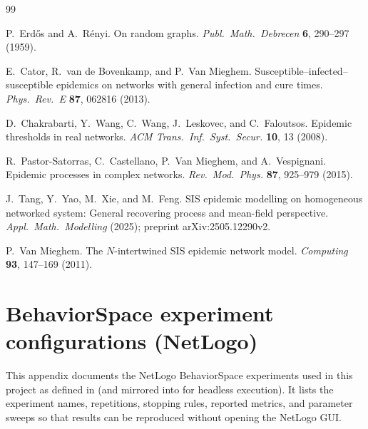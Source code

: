 \documentclass[11pt,a4paper]{article}
\begin{document}
\begin{thebibliography}{99}

P.~Erd\H{o}s and A.~R\'enyi.
\newblock On random graphs.
\newblock \emph{Publ.\ Math.\ Debrecen} \textbf{6}, 290--297 (1959).

E.~Cator, R.~van de Bovenkamp, and P.~Van Mieghem.
\newblock Susceptible--infected--susceptible epidemics on networks with general infection and cure times.
\newblock \emph{Phys.\ Rev.\ E} \textbf{87}, 062816 (2013).

D.~Chakrabarti, Y.~Wang, C.~Wang, J.~Leskovec, and C.~Faloutsos.
\newblock Epidemic thresholds in real networks.
\newblock \emph{ACM Trans.\ Inf.\ Syst.\ Secur.} \textbf{10}, 13 (2008).


R.~Pastor-Satorras, C.~Castellano, P.~Van Mieghem, and A.~Vespignani.
\newblock Epidemic processes in complex networks.
\newblock \emph{Rev.\ Mod.\ Phys.} \textbf{87}, 925--979 (2015).


J.~Tang, Y.~Yao, M.~Xie, and M.~Feng.
\newblock SIS epidemic modelling on homogeneous networked system: General recovering process and mean-field perspective.
\newblock \emph{Appl.\ Math.\ Modelling} (2025); preprint arXiv:2505.12290v2.

P.~Van Mieghem.
\newblock The $N$-intertwined SIS epidemic network model.
\newblock \emph{Computing} \textbf{93}, 147--169 (2011).

\end{thebibliography}

\clearpage
\appendix
\section{BehaviorSpace experiment configurations (NetLogo)}
\label{app:behaviorspace}

This appendix documents the NetLogo BehaviorSpace experiments used in this project as defined in  (and mirrored into  for headless execution). It lists the experiment names, repetitions, stopping rules, reported metrics, and parameter sweeps so that results can be reproduced without opening the NetLogo GUI.

\sloppy
\end{document}
